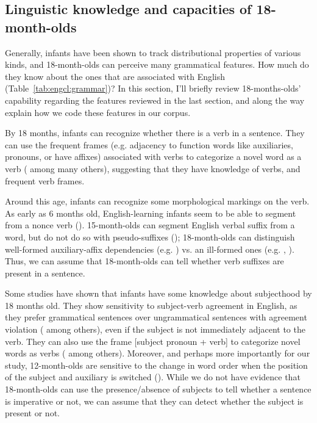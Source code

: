 \subsection{Linguistic knowledge and capacities of 18-month-olds}
\label{sec:engcl:bg:assumptions}

Generally, infants have been shown to track distributional properties of various kinds, and 18-month-olds can perceive many grammatical features. How much do they know about the ones that are associated with English \diis{} (Table~\ref{tab:engcl:grammar})? In this section, I'll briefly review 18-months-olds' capability regarding the features reviewed in the last section, and along the way explain how we code these features in our corpus. %

 By 18 months, infants can recognize whether there is a verb in a sentence. They can use the frequent frames (e.g. adjacency to function words like auxiliaries, pronouns, or have affixes) associated with verbs to categorize a novel word as a verb (\cite{echols2004verb, mintz2006verb,peterson2006aux,soderstrom2007sv, lidzoritaomaki2012, shi2014functional, helidz2017verb} among many others), suggesting that they have knowledge of verbs, and frequent verb frames. 

 Around this age, infants can recognize some morphological markings on the verb.  As early as 6 months old, English-learning infants seem to be able to segment  from a nonce verb (\cite{kimmegha2016morph}). 15-month-olds can segment English verbal suffix  from a word, but do not do so with pseudo-suffixes (\cite{mintz2013segmentation}); 18-month-olds can distinguish well-formed auxiliary-affix dependencies (e.g. ) vs. an ill-formed ones (e.g. , \cite{santelmann1998morph}). Thus, we can assume that 18-month-olds can tell whether verb suffixes are present in a sentence.

 Some studies have shown that infants have some knowledge about subjecthood by 18 months old. They show sensitivity to subject-verb agreement in English, as they prefer grammatical sentences over ungrammatical sentences with agreement violation (\cite{soderstrom2002agr, soderstrom2007sv, nazzi2011} among others), even if the subject is not immediately adjacent to the verb. They can also use the frame [subject pronoun + verb] to categorize novel words as verbs (\cite{babineau202014func,peterson2006aux, mintz2006verb,shi2014functional} among others). Moreover, and perhaps more importantly for our study, 12-month-olds are sensitive to the change in word order when the position of the subject and auxiliary is switched (\cite{geffenmintz2015wordorder}). While we do not have evidence that 18-month-olds can use the presence/absence of subjects to tell whether a sentence is imperative or not, we can assume that they can detect whether the subject is present or not.  %



